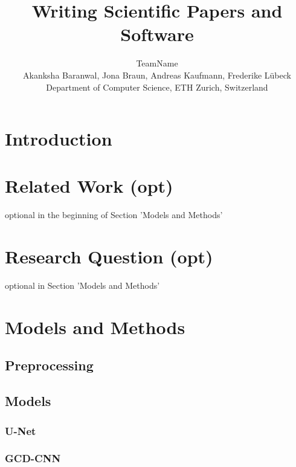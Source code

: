 \documentclass[10pt,conference,compsocconf]{IEEEtran}
\begin{document}
\title{Writing Scientific Papers and Software}

\author{
  TeamName\\
  Akanksha Baranwal, Jona Braun, Andreas Kaufmann, Frederike Lübeck \\
  Department of Computer Science, ETH Zurich, Switzerland
}

\maketitle

\begin{abstract}

\end{abstract}

\section{Introduction}

\section{Related Work (opt)}

optional in the beginning of Section 'Models and Methods'

\section{Research Question (opt)}

optional in Section 'Models and Methods'

\section{Models and Methods}


\subsection{Preprocessing}
\subsection{Models}

\subsubsection{U-Net}
\subsubsection{GCD-CNN}
\end{document}
